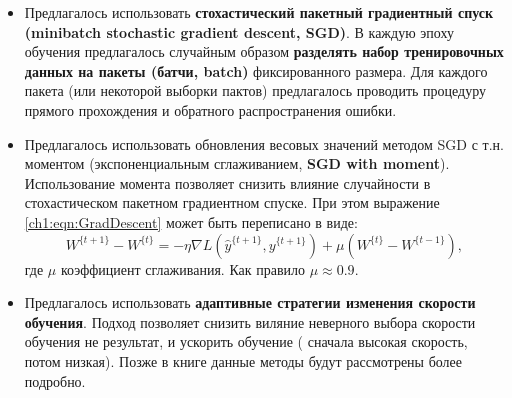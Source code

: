 \documentclass[12pt]{article}
\begin{document}
\begin{sloppypar}
\begin{itemize}
    \item Предлагалось использовать \textbf{стохастический пакетный градиентный спуск (minibatch stochastic gradient descent, SGD)}. В каждую эпоху обучения предлагалось случайным образом \textbf{разделять набор тренировочных данных на пакеты (батчи, batch)} фиксированного размера. Для каждого пакета (или некоторой выборки пактов) предлагалось проводить процедуру прямого прохождения и обратного распространения ошибки.
   
    \item Предлагалось использовать обновления весовых значений методом SGD с т.н. моментом (экспоненциальным сглаживанием, \textbf{SGD with moment}). Использование момента позволяет снизить влияние случайности в стохастическом пакетном градиентном спуске. При этом выражение \ref{ch1:eqn:GradDescent} может быть переписано в виде:
    \begin{equation}
    \label{ch1:eqn:backpropwithmomnet}
        W^{\{t+1\}} - W^{\{t\}} = - \eta \nabla L\left(\hat y^{\{t+1\}},y^{\{t+1\}}\right) + 
        \mu \left(W^{\{t\}} - W^{\{t-1\}}\right),
    \end{equation}
    где $\mu$ коэффициент сглаживания. Как правило $\mu \approx 0.9$. 
    
    \item Предлагалось использовать \textbf{адаптивные стратегии изменения скорости обучения}. Подход позволяет снизить виляние неверного выбора скорости обучения не результат, и ускорить обучение ( сначала высокая скорость, потом низкая). Позже в книге данные методы будут рассмотрены более подробно.
    

\end{itemize}
\end{sloppypar}
\end{document}
